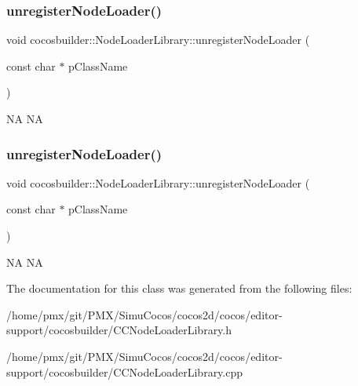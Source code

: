 \subsubsection{\texorpdfstring{unregister\+Node\+Loader()}{unregisterNodeLoader()}\hspace{0.1cm}{\footnotesize\ttfamily [1/2]}}
{\footnotesize\ttfamily void cocosbuilder\+::\+Node\+Loader\+Library\+::unregister\+Node\+Loader (\begin{DoxyParamCaption}\item[{const char $\ast$}]{p\+Class\+Name }\end{DoxyParamCaption})}

NA  NA \mbox{\label{classcocosbuilder_1_1NodeLoaderLibrary_a5439bef5ff6d008c89f1fc8c5300b701}} 
\subsubsection{\texorpdfstring{unregister\+Node\+Loader()}{unregisterNodeLoader()}\hspace{0.1cm}{\footnotesize\ttfamily [2/2]}}
{\footnotesize\ttfamily void cocosbuilder\+::\+Node\+Loader\+Library\+::unregister\+Node\+Loader (\begin{DoxyParamCaption}\item[{const char $\ast$}]{p\+Class\+Name }\end{DoxyParamCaption})}

NA  NA 

The documentation for this class was generated from the following files\+:\begin{DoxyCompactItemize}
\item 
/home/pmx/git/\+P\+M\+X/\+Simu\+Cocos/cocos2d/cocos/editor-\/support/cocosbuilder/C\+C\+Node\+Loader\+Library.\+h\item 
/home/pmx/git/\+P\+M\+X/\+Simu\+Cocos/cocos2d/cocos/editor-\/support/cocosbuilder/C\+C\+Node\+Loader\+Library.\+cpp\end{DoxyCompactItemize}
